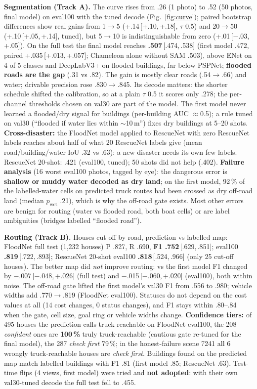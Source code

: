 \documentclass[10pt]{article}
\newcommand{\ci}[2]{\,{\footnotesize[#1,\,#2]}}
\begin{document}
\textbf{Segmentation (Track A).} The curve rises from .26 (1 photo) to .52 (50 photos, final model) on eval100 with the
tuned decode (Fig.~\ref{fig:curve}); paired bootstrap differences show real gains from 1$\rightarrow$5
(+.14\ci{+.10}{+.18}, $\tau$ 0.5) and 20$\rightarrow$50 (+.10\ci{+.05}{+.14}, tuned), but 5$\rightarrow$10 is
indistinguishable from zero (+.01\ci{$-$.03}{+.05}). On the full test the final model reaches \textbf{.507}\ci{.474}{.538}
(first model .472, paired +.035\ci{+.013}{+.057}; Chameleon alone without SAM .503), above ENet on 4 of 5 classes and
DeepLabV3+ on flooded buildings, far below PSPNet; \textbf{flooded roads are the gap} (.31 vs .82). The gain is mostly
clear roads (.54$\rightarrow$.66) and water; drivable precision rose .830$\rightarrow$.845. Its decode matters: the shorter
schedule shifted the calibration, so at a plain $\tau$ 0.5 it scores only .278; the per-channel thresholds chosen on
val30 are part of the model. The first model never learned a flooded/dry signal for buildings (per-building AUC
$\approx$0.5); a rule tuned on val30 (``flooded if water lies within $\sim$10\,m'') fixes dry buildings at 5--20 shots. \textbf{Cross-disaster:} the FloodNet model applied to RescueNet
with zero RescueNet labels reaches about half of what 20 RescueNet labels give (mean road/building/water IoU .32 vs .63):
a new disaster needs its own few labels. RescueNet 20-shot: .421 (eval100, tuned); 50 shots did not help (.402).
\textbf{Failure analysis} (16 worst eval100 photos, tagged by eye): the dangerous error is \textbf{shallow or muddy water
decoded as dry land}; on the first model, 92\,\% of the labelled-water cells on predicted truck routes had been crossed as dry off-road land
(median $p_\text{wet}$ .21), which is why the off-road gate exists. Most other errors are benign for routing
(water vs flooded road, both boat cells) or are label ambiguities (bridges labelled ``flooded road'').

\textbf{Routing (Track B).} Houses cut off by road, prediction vs labelled map: FloodNet full test (1,232 houses)
P .827, R .690, \textbf{F1 .752}\ci{.629}{.851}; eval100 \textbf{.819}\ci{.722}{.893}; RescueNet 20-shot eval100
\textbf{.818}\ci{.524}{.966} (only 25 cut-off houses). The better map did \emph{not} improve routing: vs the first model
F1 changed by $-$.007\ci{$-$.048}{+.026} (full test) and $-$.015\ci{$-$.060}{+.020} (eval100), both within noise. The
off-road gate lifted the first model's val30 F1 from .556 to .980; vehicle widths add .770$\rightarrow$.819 (FloodNet
eval100). Statuses do not depend on the cost values at all (14 cost changes, 0 status changes), and F1 stays within
.80--.84 when the gate, cell size, goal ring or vehicle widths change. \textbf{Confidence tiers:} of 495 houses the
prediction calls truck-reachable on FloodNet eval100, the 208 \emph{confident} ones are \textbf{100\,\%} truly
truck-reachable (cautious gate re-tuned for the final model), the 287 \emph{check first} 79\,\%; in the honest-failure
scene 7241 all 6 wrongly truck-reachable houses are \emph{check first}. Buildings found on the predicted map match
labelled buildings with F1 .81 (first model .85; RescueNet .63). Test-time flips (4 views, first model) were tried and
\textbf{not adopted}: with their own val30-tuned decode the full test fell to .455.
\end{document}
